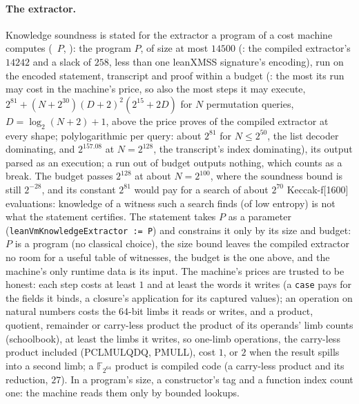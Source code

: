 \documentclass[11pt]{article}
\begin{document}
\paragraph{The extractor.} Knowledge soundness is stated for the extractor a program of a cost
machine computes (~$P$, ): the
program $P$, of size at most $14500$ (: the compiled
extractor's $14242$ and a slack of $258$, less than one leanXMSS signature's encoding), run on the encoded
statement, transcript and proof within a budget (: the most its
run may cost in the machine's price, so also the most steps it may execute,
$2^{81} + (N + 2^{30})(D + 2)^2(2^{15} + 2D)$ for $N$ permutation queries, $D = \log_2(N + 2) + 1$,
above the price  proves of the compiled extractor at every shape; polylogarithmic per
query: about $2^{81}$ for $N \le 2^{50}$, the list decoder dominating, and $2^{157.08}$ at
$N = 2^{128}$, the transcript's index dominating), its output parsed as an execution; a run out of
budget outputs nothing, which counts as a break. The budget passes $2^{128}$ at about
$N = 2^{100}$, where the soundness bound is still $2^{-28}$, and its constant $2^{81}$ would pay for
a search of about $2^{70}$ Keccak-f[1600] evaluations: knowledge of a witness such a search finds
(of low entropy) is not what the statement certifies. The
statement takes $P$ as a parameter (\texttt{leanVmKnowledgeExtractor := P}) and constrains it only
by its size and budget: $P$ is a program (no classical choice), the size bound leaves the compiled
extractor no room for a useful table of witnesses, the budget is the one above, and the machine's
only runtime data is its input. The machine's prices are trusted to be honest: each step costs at
least $1$ and at least the words it writes (a \texttt{case} pays for the fields it binds, a
closure's application for its captured values); an operation on natural numbers costs the 64-bit
limbs it reads or writes, and a product, quotient, remainder or carry-less product the product of
its operands' limb counts (schoolbook), at least the limbs it writes, so one-limb operations, the
carry-less product included (PCLMULQDQ, PMULL), cost $1$, or $2$ when the result spills into a
second limb; a $\mathbb{F}_{2^{64}}$ product is compiled code (a carry-less product
and its reduction, $27$). In a program's size, a constructor's tag and a function index count one:
the machine reads them only by bounded lookups.
\end{document}
